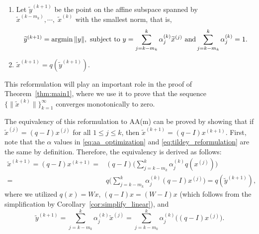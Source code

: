 \documentclass[11pt]{article}
\newcommand{\bx}{\bm{x}}
\newcommand{\bI}{\bm{I}}
\DeclareMathOperator*{\argmin}{argmin}
\begin{document}
\begin{enumerate}
\item Let $\widetilde{y}^{(k+1)}$ be the point on the affine subspace spanned by $\widetilde{x}^{(k-m_k)}, \cdots, \; \widetilde{x}^{(k)}$ with the smallest norm, that is,
\begin{equation}\label{eq:tildey_reformulation}
\color{black}
\widetilde{y}^{(k+1)}=\argmin \|y\|,\,\,\text{subject to }y=\sum_{j=k-m_k}^{k}\alpha_j^{(k)}\widetilde{x}^{(j)}\,\,\text{and} \sum_{j=k-m_k}^{k} \alpha_j^{(k)}=1.
\end{equation}
\item  $\widetilde{x}^{(k+1)}
=q(\widetilde{y}^{(k+1)})$.
\end{enumerate}
{\color{black}
This reformulation will play an important role in the proof of Theorem~\ref{thm:main1}, where we use it to prove that the sequence  $\{\|\widetilde{x}^{(k)}\|\}_{k=1}^\infty$ converges monotonically to zero.    

The equivalency of this reformulation to AA(m) can be proved 
 by showing that if $\widetilde{x}^{(j)}=(q-I)x^{(j)}$ for all $1\leq j\leq k$, then $\widetilde{x}^{(k+1)}=(q-I)x^{(k+1)}$. First, note that the $\alpha$ values in \eqref{eq:aa_optimization} and \eqref{eq:tildey_reformulation} are the same by definition. Therefore, the equivalency is derived as follows:
\begin{align}\label{eq:reformulation_linear_update}
\widetilde{x}^{(k+1)}=(q-I)x^{(k+1)} 
=&(q-I)\Big(\sum_{j=k-m_k}^{k}\alpha_j^{(k)}q(x^{(j)})\Big)%
\\=&q\Big(\sum_{j=k-m_k}^{k}\alpha_j^{(k)}(q-I)x^{(j)}\Big) \nonumber =q(\widetilde{y}^{(k+1)}), 
\end{align}
where we utilized $q(x)=Wx$, $(q-I)x=(W-I)x$ (which follows from the simplification by Corollary~\ref{cor:simplify_linear}), and 
\[
\widetilde{y}^{(k+1)}=\sum_{j=k-m_k}^{k}\alpha_j^{(k)}\widetilde{x}^{(j)} 
=\sum_{j=k-m_k}^{k}\alpha_j^{(k)}\big((q-I)x^{(j)}\big).
\]

}
\end{document}
